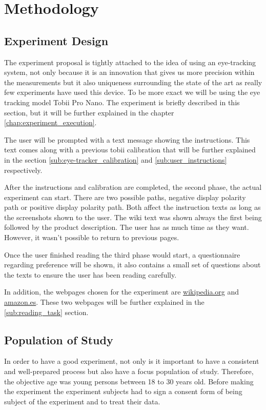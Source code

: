 \chapter{Methodology}
\label{chap:methodology}

\section{Experiment Design}
The experiment proposal is tightly attached to the idea of using an eye-tracking 
system, not only because it is an innovation that gives us more precision within 
the measurements but it also uniqueness surrounding the state of the art as really 
few experiments have used this device. To be more exact we will be using the eye 
tracking model Tobii Pro Nano\cite{tobii_pro_nano}. The experiment is briefly described 
in this section, but it will be further explained in the chapter \ref{chap:experiment_execution}.

The user will be prompted with a text message showing the instructions. 
This text comes along with a previous tobii calibration that will be further 
explained in the section \ref{sub:eye-tracker_calibration} and \ref{sub:user_instructions} respectively. 
 
After the instructions and calibration are completed, the second phase, 
the actual experiment can start. There are two possible paths, 
negative display polarity path or positive display polarity path. Both 
affect the instruction texts as long as the screenshots shown to the user. The 
wiki text was shown always the first being followed by the product description. 
The user has as much time as they want.  However, it wasn’t possible to return to 
previous pages.

Once the user finished reading the third phase would start, a questionnaire regarding
 preference will be shown, it also contains a small set of questions about the texts
  to ensure the user has been reading carefully. 

In addition, the webpages chosen for the experiment are \url{wikipedia.org} and \url{amazon.es}. 
These two webpages will be further explained in the \ref{sub:reading_task} section. 
\section{Population of Study}
In order to have a good experiment, not only is it important to have a consistent and well-prepared 
process but also have a focus population of study. Therefore, the objective age was young persons 
between 18 to 30 years old. Before making the experiment the experiment subjects had to sign a consent form
of being subject of the experiment and to treat their data.

